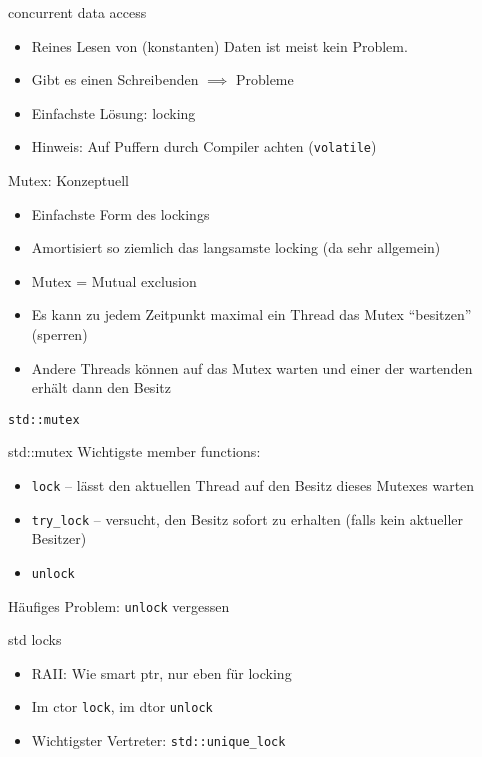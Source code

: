 \begin{frame}{concurrent data access}
	\begin{itemize}
		\item Reines Lesen von (konstanten) Daten ist meist kein Problem.
		\item Gibt es einen Schreibenden $\implies$ Probleme
		\item Einfachste Lösung: locking
		\item Hinweis: Auf Puffern durch Compiler achten (\texttt{volatile})
	\end{itemize}
	
	\pause
	
	\begin{block}{Mutex: Konzeptuell}
		\begin{itemize}
			\item Einfachste Form des lockings
			\item Amortisiert so ziemlich das langsamste locking (da sehr allgemein)
			\item Mutex = Mutual exclusion
			\item Es kann zu jedem Zeitpunkt maximal ein Thread das Mutex \enquote{besitzen} (sperren)
			\item Andere Threads können auf das Mutex warten und einer der wartenden erhält dann den Besitz
		\end{itemize}
	\end{block}
\end{frame}

\begin{frame}{ \texttt{std::mutex} }
	\begin{block}{std::mutex}
		Wichtigste member functions:
		\begin{itemize}
			\item \texttt{lock} -- lässt den aktuellen Thread auf den Besitz dieses Mutexes warten
			\item \texttt{try\_lock} -- versucht, den Besitz sofort zu erhalten (falls kein aktueller Besitzer)
			\item \texttt{unlock}
		\end{itemize}
	\end{block}
	
	\pause
	
	\alert{Häufiges Problem: \texttt{unlock} vergessen}
	\begin{block}{std locks}
		\begin{itemize}
			\item RAII: Wie smart ptr, nur eben für locking
			\item Im ctor \texttt{lock}, im dtor \texttt{unlock}
			\item Wichtigster Vertreter: \texttt{std::unique\_lock}
		\end{itemize}
	\end{block}
\end{frame}

